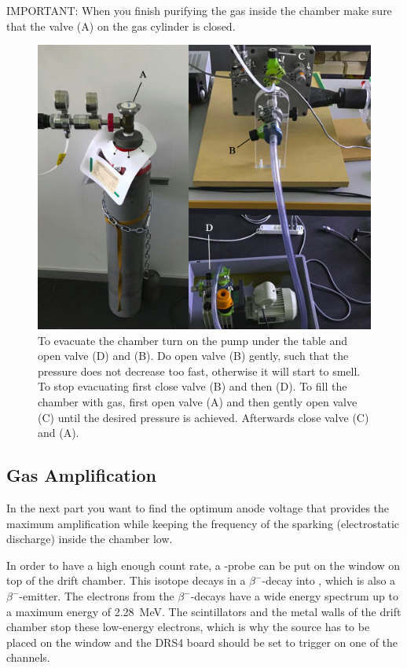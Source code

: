\documentclass[12pt]{article}
\begin{document}
IMPORTANT: When you finish purifying the gas inside the chamber make sure that the valve (A) on the gas cylinder is closed.

\begin{figure}[!h]
	\includegraphics[width=12cm]{pics/valve}
	\centering
	\caption{To evacuate the chamber turn on the pump under the table and open valve (D) and (B). Do open valve (B) gently, such that the pressure does not decrease too fast, otherwise it will start to smell. To stop evacuating first close valve (B) and then (D). To fill the chamber with gas, first open valve (A) and then gently open valve (C) until the desired pressure is achieved. Afterwards close valve (C) and (A).}
	\label{fig:gas}
\end{figure}

\subsection{Gas Amplification}
In the next part you want to find the optimum anode voltage that provides the maximum amplification while keeping the frequency of the sparking (electrostatic discharge) inside the chamber low. 

In order to have a high enough count rate, a -probe can be put on the window on top of the drift chamber. This isotope decays in a $\beta^-$-decay into , which is also a $\beta^-$-emitter. The electrons from the $\beta^-$-decays have a wide energy spectrum up to a maximum energy of \SI{2.28}{\mega\electronvolt}. The scintillators and the metal walls of the drift chamber stop these low-energy electrons, which is why the source has to be placed on the window and the DRS4 board should be set to trigger on one of the channels.
\end{document}
